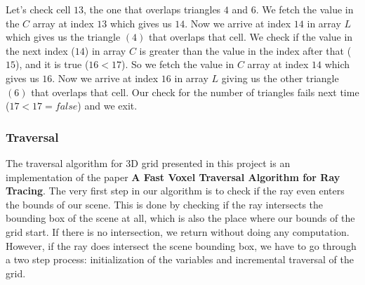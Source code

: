 \documentclass[11pt,a4paper]{article}
\begin{document}
\noindent
Let's check cell $13$, the one that overlaps triangles $4$ and $6$. We fetch the value in the $C$ array at index $13$ which gives us $14$. Now we arrive at index $14$ in array $L$ which gives us the triangle $(4)$ that overlaps that cell. We check if the value in the next index ($14$) in array $C$ is greater than the value in the index after that ($15$), and it is true ($16 < 17$). So we fetch the value in $C$ array at index $14$ which gives us $16$. Now we arrive at index $16$ in array $L$ giving us the other triangle $(6)$ that overlaps that cell. Our check for the number of triangles fails next time ($17 < 17 = false$) and we exit.
\subsubsection{Traversal}

The  traversal algorithm for 3D grid presented in this project is an implementation of the paper \textbf{A Fast Voxel Traversal Algorithm for Ray Tracing}\cite{amanatides1987fast}. The very first step in our algorithm is to check if the ray even enters the bounds of our scene. This is done by checking if the ray intersects the bounding box of the scene at all, which is also the place where our bounds of the grid start. If there is no intersection, we return without doing any computation. However, if the ray does intersect the scene bounding box, we have to go through a two step process: initialization of the variables and incremental traversal of the grid. 
\end{document}
